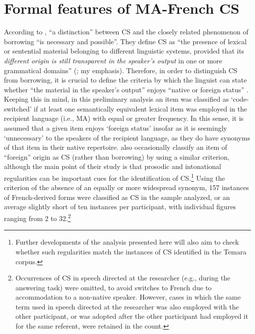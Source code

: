 \documentclass[output=paper]{langscibook}
\begin{document}

\setcounter{footnote}{14}


\section{Formal features of \gls*{MA}-French \gls*{CS}}

According to \citet[285]{manfredi_language_2015}, “a distinction” between \gls*{CS} and the closely related phenomenon of borrowing “is necessary and possible”. They define \gls*{CS} as “the presence of lexical or sentential material belonging to different linguistic systems, provided that its \textit{different origin is still transparent in the speaker’s output} in one or more grammatical domains” (\citealt[286]{manfredi_language_2015}; my emphasis). Therefore, in order to distinguish \gls*{CS} from borrowing, it is crucial to define the criteria by which the linguist can state whether “the material in the speaker’s output” enjoys “native or foreign status” \citep[286]{manfredi_language_2015}. Keeping this in mind, in this preliminary analysis an item was classified as ‘code-switched' if at least one semantically equivalent lexical item was employed in the recipient language (i.e., \gls*{MA}) with equal or greater frequency. In this sense, it is assumed that a given item enjoys ‘foreign status' insofar as it is seemingly ‘unnecessary' to the speakers of the recipient language, as they do have synonyms of that item in their native repertoire. \citet[300, 306]{manfredi_language_2015} also occasionally classify an item of “foreign” origin as \gls*{CS} (rather than borrowing) by using a similar criterion, although the main point of their study is that prosodic and intonational regularities can be important cues for the identification of \gls*{CS}.\footnote{Further developments of the analysis presented here will also aim to check whether such regularities match the instances of \gls*{CS} identified in the Temara corpus.} Using the criterion of the absence of an equally or more widespread synonym, 157 instances of French-derived forms were classified as \gls*{CS} in the sample analyzed, or an average slightly short of ten instances per participant, with individual figures ranging from 2 to 32.\footnote{Occurrences of \gls*{CS} in speech directed at the researcher (e.g., during the answering task) were omitted, to avoid switches to French due to accommodation to a non-native speaker. However, cases in which the same term used in speech directed at the researcher was also employed with the other participant, or was adopted after the other participant had employed it for the same referent, were retained in the count.} 
\end{document}
